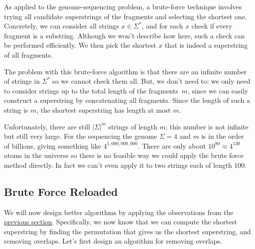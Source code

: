 \begin{cluster}
\label{grp:grm:genome::brute-force-algorithm-1}

\begin{gram}
\label{grm:genome::brute-force-algorithm-1}
As applied to the genome-sequencing problem, a brute-force technique
involves trying all candidate superstrings of the fragments and
selecting the shortest one.
Concretely, we can consider all strings $x \in \Sigma^*$, and for each
$x$ check if every fragment is a substring.
Although we won't describe how here, such a check can be performed
efficiently.
We then pick the shortest $x$ that is indeed a superstring of
all fragments.

The problem with this brute-force algorithm is that there are an
infinite number of strings in $\Sigma^*$ so we cannot check them all.
But, we don't need to: we only need to consider strings up to
the total length of the fragments~$m$, since we can easily construct a
superstring by concatenating all fragments. 
Since the length of such a string is $m$, the shortest superstring has
length at most $m$.

\end{gram}
\end{cluster}

\begin{cluster}
\label{grp:nt:genome::unfortunately}

\begin{note}
\label{nt:genome::unfortunately}
Unfortunately, there are still $|\Sigma|^m$ strings of length $m$;
this number is not infinite but still very large.  For the sequencing
the genome $\Sigma = 4$ and $m$ is in the order of billions, giving
something like $4^{1,000,000,000}$.  
There are only about $10^{80}
\approx 4^{130}$ atoms in the universe so there is no feasible way we
could apply the brute force method directly.  
In fact we can't even apply it to two strings each of length $100$.

\end{note}
\end{cluster}


\subsection{Brute Force Reloaded}
\label{sec:genome::alg::bf-reloaded}

\begin{cluster}
\label{grp:grm:genome::design}

\begin{gram}
\label{grm:genome::design}
We will now design better algorithms by applying the observations from
the \href{sec:genome::prob::understanding}{previous section}. 
Specifically, we now know that we can compute the shortest superstring
by finding the permutation that gives us the shortest superstring, and
removing overlaps.
Let's first design an algorithm for removing overlaps.

\end{gram}
\end{cluster}


